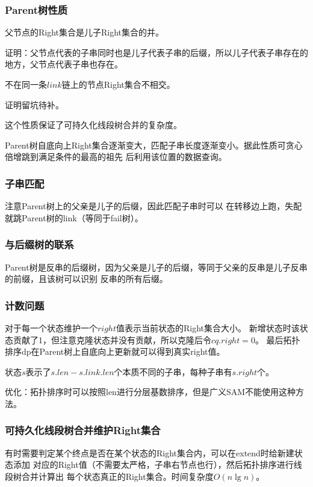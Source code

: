 \subsubsection{Parent树性质}
\begin{theorem}
    父节点的Right集合是儿子Right集合的并。
\end{theorem}

证明：父节点代表的子串同时也是儿子代表子串的后缀，所以儿子代表子串存在的地方，父节点代表子串也存在。

\begin{theorem}
    不在同一条$link$链上的节点Right集合不相交。
\end{theorem}

证明留坑待补。

这个性质保证了可持久化线段树合并的复杂度。

Parent树自底向上Right集合逐渐变大，匹配子串长度逐渐变小。据此性质可贪心倍增跳到满足条件的最高的祖先
后利用该位置的数据查询。
\subsubsection{子串匹配}
注意Parent树上的父亲是儿子的后缀，因此匹配子串时可以
在转移边上跑，失配就跳Parent树的link（等同于fail树）。
\subsubsection{与后缀树的联系}
Parent树是反串的后缀树，因为父亲是儿子的后缀，等同于父亲的反串是儿子反串的前缀，且该树可以识别
反串的所有后缀。
\subsubsection{计数问题}
对于每一个状态维护一个$right$值表示当前状态的Right集合大小。
新增状态时该状态贡献了1，但注意克隆状态并没有贡献，所以克隆后令$cq.right=0$。
最后拓扑排序dp在Parent树上自底向上更新就可以得到真实right值。

状态$s$表示了$s.len-s.link.len$个本质不同的子串，每种子串有$s.right$个。

优化：拓扑排序时可以按照len进行分层基数排序，但是广义SAM不能使用这种方法。
\subsubsection{可持久化线段树合并维护Right集合}
有时需要判定某个终点是否在某个状态的Right集合内，可以在extend时给新建状态添加
对应的Right值（不需要太严格，子串右节点也行），然后拓扑排序进行线段树合并计算出
每个状态真正的Right集合。时间复杂度$O(n\lg n)$。

